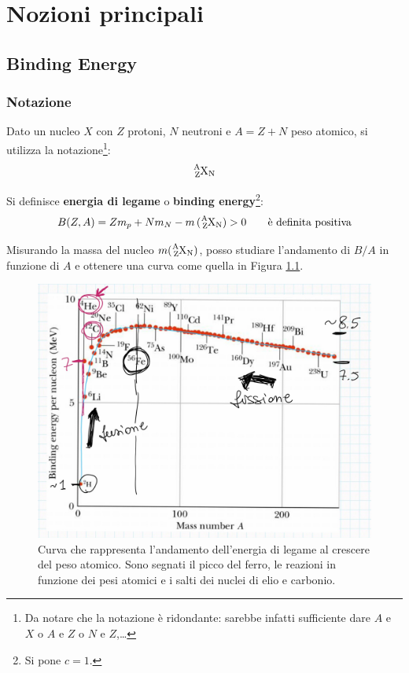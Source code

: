 \chapter{Nozioni principali}
\section{Binding Energy}
\subsection{Notazione} 
Dato un nucleo $X$ con $Z$ protoni, $N$ neutroni e $A=Z+N$ peso atomico, si utilizza la notazione\footnote{Da notare che la notazione è ridondante: sarebbe infatti sufficiente dare $A$ e $X$ o $A$ e $Z$ o $N$ e $Z$,\dots}:
$$\ce{^{A}_{Z}X_N}$$

\begin{definition}
Si definisce \textbf{energia di legame} o \textbf{binding energy}\footnote{Si pone $c=1$.}:
$$B(Z,A) = Z m_p + N m_N - m \,(\ce{^{A}_{Z}X_N})>0\qquad \text{è definita positiva}$$
\end{definition}
\noindent Misurando la massa del nucleo $m (\ce{^{A}_{Z}X_N})$, posso studiare l'andamento di $B/A$ in funzione di $A$ e ottenere una curva come quella in Figura \ref{B/A}.

\begin{figure}[h]
    \centering
    \includegraphics[scale=0.26]{Immagini/curva_elementi.png}
    \caption{Curva che rappresenta l'andamento dell'energia di legame al crescere del peso atomico. Sono segnati il picco del ferro, le reazioni in funzione dei pesi atomici e i salti dei nuclei di elio e carbonio.}
    \label{B/A}
\end{figure}

